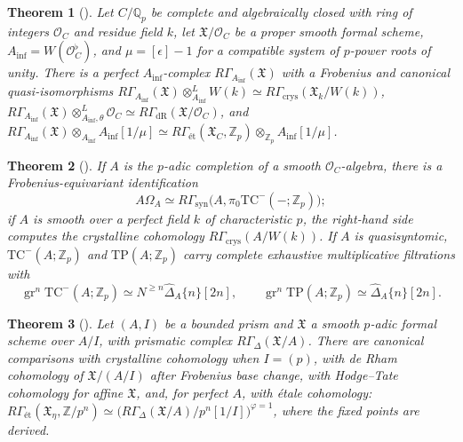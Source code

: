 \documentclass[11pt]{amsart}
\theoremstyle{plain}
\newtheorem{theorem}{Theorem}[section]
\theoremstyle{definition}
\theoremstyle{remark}
\numberwithin{equation}{section}
\newcommand{\Q}{\mathbb{Q}}
\newcommand{\Z}{\mathbb{Z}}
\newcommand{\cO}{\mathcal{O}}
\begin{document}
\begin{theorem}[{\cite[Theorem~1.8, pp.~5--6]%
{BhattMorrowScholze2018Integral}}]\label{thm:imp-bms1}
Let $C/\Q_p$ be complete and algebraically closed with ring of integers
$\cO_C$ and residue field $k$, let $\mathfrak X/\cO_C$ be a proper smooth
formal scheme, $A_{\inf}=W(\cO_C^\flat)$, and $\mu=[\epsilon]-1$ for a
compatible system of $p$-power roots of unity. There is a perfect
$A_{\inf}$-complex $R\Gamma_{A_{\inf}}(\mathfrak X)$ with a Frobenius and
canonical quasi-isomorphisms
$R\Gamma_{A_{\inf}}(\mathfrak X)\otimes^L_{A_{\inf}}W(k)\simeq
R\Gamma_{\mathrm{crys}}(\mathfrak X_k/W(k))$,
$R\Gamma_{A_{\inf}}(\mathfrak X)\otimes^L_{A_{\inf},\theta}\cO_C\simeq
R\Gamma_{\mathrm{dR}}(\mathfrak X/\cO_C)$, and
$R\Gamma_{A_{\inf}}(\mathfrak X)\otimes_{A_{\inf}}A_{\inf}[1/\mu]\simeq
R\Gamma_{\text{\'et}}(\mathfrak X_C,\Z_p)\otimes_{\Z_p}A_{\inf}[1/\mu]$.
\end{theorem}

\begin{theorem}[{\cite[Theorems~1.8, 1.10, and~1.12(4), pp.~5--7]%
{BhattMorrowScholze2019THH}}]\label{thm:imp-bms2}
If $A$ is the $p$-adic completion of a smooth $\cO_C$-algebra, there is
a Frobenius-equivariant identification
\[
A\Omega_A\simeq R\Gamma_{\mathrm{syn}}\bigl(A,
\pi_0\mathrm{TC}^-(-;\Z_p)\bigr);
\]
if $A$ is smooth over a perfect field $k$ of characteristic $p$,
the right-hand side computes the crystalline cohomology
$R\Gamma_{\mathrm{crys}}(A/W(k))$. If $A$ is
quasisyntomic, $\mathrm{TC}^-(A;\Z_p)$ and $\mathrm{TP}(A;\Z_p)$ carry
complete exhaustive multiplicative filtrations with
\[
\operatorname{gr}^n\mathrm{TC}^-(A;\Z_p)\simeq
N^{\ge n}\widehat\Delta_A\{n\}[2n],\qquad
\operatorname{gr}^n\mathrm{TP}(A;\Z_p)\simeq\widehat\Delta_A\{n\}[2n].
\]
\end{theorem}

\begin{theorem}[{\cite[Theorem~1.8, p.~4]{BhattScholze2022Prisms}}]
\label{thm:imp-bs}
Let $(A,I)$ be a bounded prism and $\mathfrak X$ a smooth $p$-adic formal
scheme over $A/I$, with prismatic complex
$R\Gamma_\Delta(\mathfrak X/A)$. There are canonical comparisons with
crystalline cohomology when $I=(p)$, with de Rham cohomology of
$\mathfrak X/(A/I)$ after Frobenius base change, with Hodge--Tate
cohomology for affine $\mathfrak X$, and, for perfect $A$, with \'etale
cohomology:
$R\Gamma_{\text{\'et}}(\mathfrak X_\eta,\Z/p^n)\simeq
\bigl(R\Gamma_\Delta(\mathfrak X/A)/p^n[1/I]\bigr)^{\varphi=1}$, where
the fixed points are derived.
\end{theorem}
\end{document}
